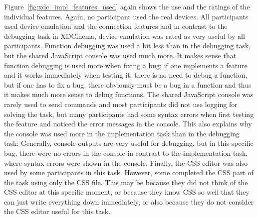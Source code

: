 Figure~\ref{fig:xdc_impl_features_used} again shows the use and the ratings of the individual features. Again, no participant used the real devices. All participants used device emulation and the connection features and in contrast to the debugging task in XDCinema, device emulation was rated as very useful by all participants. Function debugging was used a bit less than in the debugging task, but the shared JavaScript console was used much more. It makes sense that function debugging is used more when fixing a bug; if one implements a feature and it works immediately when testing it, there is no need to debug a function, but if one has to fix a bug, there obviously must be a bug in a function and thus it makes much more sense to debug functions. The shared JavaScript console was rarely used to send commands and most participants did not use logging for solving the task, but many participants had some syntax errors when first testing the feature and noticed the error messages in the console. This also explains why the console was used more in the implementation task than in the debugging task: Generally, console outputs are very useful for debugging, but in this specific bug, there were no errors in the console in contrast to the implementation task, where syntax errors were shown in the console. Finally, the CSS editor was also used by some participants in this task. However, some completed the CSS part of the task using only the CSS file. This may be because they did not think of the CSS editor at this specific moment, or because they know CSS so well that they can just write everything down immediately, or also because they do not consider the CSS editor useful for this task.


